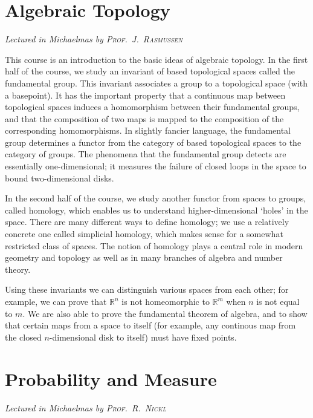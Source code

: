 \newcommand{\yearnumber}{II}


\chapter[Algebraic Topology \\ \textnormal{\emph{Lectured in Michaelmas \oldstylenums{2022} by \textsc{Prof.\ J.\ Rasmussen}}}]{Algebraic Topology}
\emph{\Large Lectured in Michaelmas  by \textsc{Prof.\ J.\ Rasmussen}}

This course is an introduction to the basic ideas of algebraic topology.
In the first half of the course, we study an invariant of based topological spaces called the fundamental group.
This invariant associates a group to a topological space (with a basepoint).
It has the important property that a continuous map between topological spaces induces a homomorphism between their fundamental groups, and that the composition of two maps is mapped to the composition of the corresponding homomorphisms.
In slightly fancier language, the fundamental group determines a functor from the category of based topological spaces to the category of groups.
The phenomena that the fundamental group detects are essentially one-dimensional; it measures the failure of closed loops in the space to bound two-dimensional disks.

In the second half of the course, we study another functor from spaces to groups, called homology, which enables us to understand higher-dimensional `holes' in the space.
There are many different ways to define homology; we use a relatively concrete one called simplicial homology, which makes sense for a somewhat restricted class of spaces.
The notion of homology plays a central role in modern geometry and topology as well as in many branches of algebra and number theory.

Using these invariants we can distinguish various spaces from each other; for example, we can prove that \( \mathbb R^n \) is not homeomorphic to \( \mathbb R^m \) when \( n \) is not equal to \( m \).
We are also able to prove the fundamental theorem of algebra, and to show that certain maps from a space to itself (for example, any continous map from the closed \( n \)-dimensional disk to itself) must have fixed points.



\chapter[Probability and Measure \\ \textnormal{\emph{Lectured in Michaelmas \oldstylenums{2022} by \textsc{Prof.\ R.\ Nickl}}}]{Probability and Measure}
\emph{\Large Lectured in Michaelmas  by \textsc{Prof.\ R.\ Nickl}}

